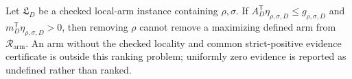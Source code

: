 Let \(\mathfrak L_D\) be a checked local-arm instance containing \(\rho,\sigma\).  If \(A_D^{\mathsf T}\eta_{\rho,\sigma,D}\le g_{\rho,\sigma,D}\) and \(m_D^{\mathsf T}\eta_{\rho,\sigma,D}>0\), then removing \(\rho\) cannot remove a maximizing defined arm from \(\mathcal R_{\mathrm{arm}}\).  An arm without the checked locality and common strict-positive evidence certificate is outside this ranking problem; uniformly zero evidence is reported as undefined rather than ranked.